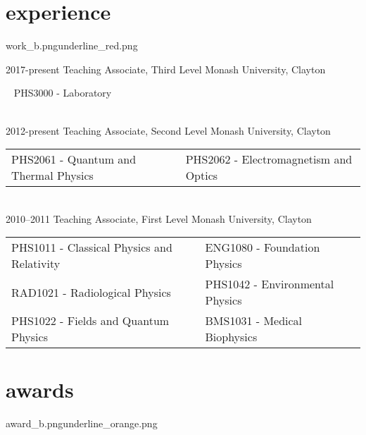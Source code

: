 \documentclass[a4paper]{friggeri-cv} %
\newcommand{\spacer}{\vspace{0.0cm}}
\begin{document}
\section{experience}{work_b.png}{underline_red.png}




\begin{entrylist}

\entry
{2017-present\phantom{X}}
{Teaching {\normalfont Associate, Third Level}}
{Monash University, Clayton}
{
~
PHS3000 - Laboratory



}\\


\entry
{2012-present\phantom{X}}
{Teaching {\normalfont Associate, Second Level}}
{Monash University, Clayton}
{
\begin{tabular}{p{8cm}l}
PHS2061 - Quantum and Thermal Physics&
PHS2062 - Electromagnetism and Optics
\end{tabular}




}\\

\entry
{2010--2011}
{Teaching {\normalfont Associate, First Level}}
{Monash University, Clayton}
{
\begin{tabular}{p{8cm}l}
PHS1011 - Classical Physics and Relativity&
ENG1080 - Foundation Physics\\
RAD1021 - Radiological Physics&
PHS1042 - Environmental Physics\\
PHS1022 - Fields and Quantum Physics&
BMS1031 - Medical Biophysics
\end{tabular}
}





\end{entrylist}

\spacer
\section{awards}{award_b.png}{underline_orange.png}
\end{document}
